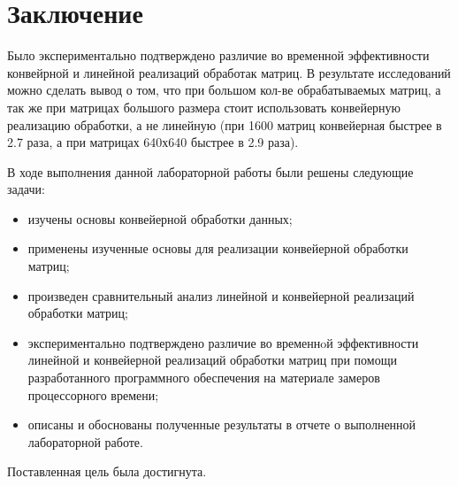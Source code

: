 \chapter*{Заключение}

Было экспериментально подтверждено различие во временной эффективности конвейрной и линейной реализаций обработак матриц. В результате исследований можно сделать вывод о том, что при большом кол-ве обрабатываемых матриц, а так же при матрицах большого размера стоит использовать конвейерную реализацию обработки, а не линейную (при 1600 матриц конвейерная быстрее в 2.7 раза, а при матрицах 640х640 быстрее в 2.9 раза).

\vspace{5mm}

В ходе выполнения данной лабораторной работы были решены следующие задачи:
\begin{itemize}[label=---]
	\item изучены основы конвейерной обработки данных;
	\item применены изученные основы для реализации конвейерной обработки матриц;
	\item произведен сравнительный анализ линейной и конвейерной реализаций обработки матриц;
	\item экспериментально подтверждено различие во временнoй эффективности линейной и конвейерной реализаций обработки матриц при помощи разработанного программного обеспечения на материале замеров процессорного времени;
	\item описаны и обоснованы полученные результаты в отчете о выполненной лабораторной работе.
\end{itemize}

Поставленная цель была достигнута.
